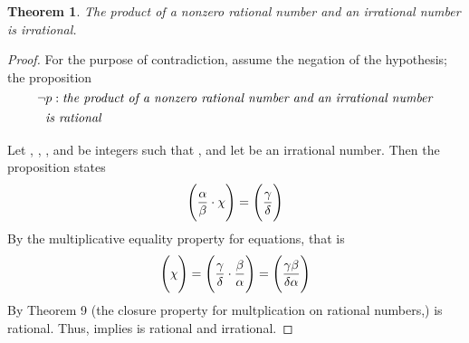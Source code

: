 \documentclass[preview]{standalone}
\newtheorem{theorem}{Theorem}
\begin{document}
\begin{theorem} %
    The product of a nonzero rational number and an irrational number is 
    irrational.
\end{theorem}

\begin{proof}
    For the purpose of contradiction, assume the negation of the hypothesis; 
    the proposition 
        $$\lnot p : \emph{the product of a nonzero rational number and an 
        irrational number}$$
        $\indent \indent \emph{is rational}$
        \\ \\
    Let \bm{$\alpha$}, \bm{$\beta$}, \bm{$\gamma$}, and \bm{$\delta$} be integers such that 
    , and let \bm{$\chi$} be an irrational number. 
    Then the proposition  states 
    \begin{equation*}
        \Bigg(
            \frac{\alpha}{\beta} \space \cdot \space \chi 
        \Bigg)
            = 
        \Bigg(
            \frac{\gamma}{\delta}
        \Bigg)
    \end{equation*}    
    By the multiplicative equality property for equations, that is
    \begin{equation*}
        \Bigg(
            \chi
        \Bigg) 
            = 
        \Bigg(
            \frac{\gamma}{\delta} \space \cdot \space \frac{\beta}{\alpha} 
        \Bigg)
            =
        \Bigg( 
            \frac{\gamma\beta}{\delta\alpha}
        \Bigg)
    \end{equation*}
    By Theorem 9 (the closure property for multplication on rational numbers,) 
    \bm{$\chi$} is rational. 
    Thus,  implies \bm{$\chi$} is rational and irrational.
\end{proof}
\end{document}
